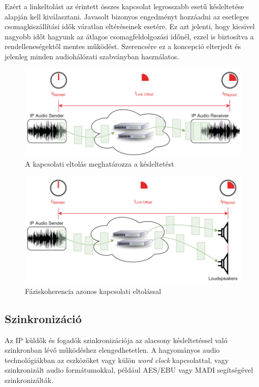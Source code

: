 Ezért a linkeltolást az érintett összes kapcsolat legrosszabb esetű késleltetése alapján kell kiválasztani. 
Javasolt bizonyos engedményt hozzáadni az esetleges csomagkiszállítási idők váratlan eltéréseinek esetére.
Ez azt jelenti, hogy kicsivel nagyobb időt hagyunk az átlagos csomagfeldolgozási időnél, 
ezzel is biztosítva a rendelleneségektől mentes működést.
Szerencsére ez a koncepció elterjedt és jelenleg minden audiohálózati szabványban használatos. 
\begin{figure}[H]
	\centering
	\includegraphics[width=\linewidth, keepaspectratio]{figures/link_offset_latency.png}
	\caption{A kapcsolati eltolás meghatározza a késleltetést \cite{AHNERT2023}}
	\label {fig:link_offset_latency}
\end{figure}
\begin{figure}[H]
	\centering
	\includegraphics[width=\linewidth, keepaspectratio]{figures/phase_coherence_link_offset.png}
	\caption{Fáziskoherencia azonos kapcsolati eltolással \cite{AHNERT2023}}
	\label {fig:phase_coherence_link_offset}
\end{figure}
\subsection{Szinkronizáció}
Az IP küldők és fogadók szinkronizációja az alacsony késleltetéssel való szinkronban lévő működéshez elengedhetetlen.
A hagyományos audio technológiákban az eszközöket vagy külön \textit{word clock} kapcsolattal, 
vagy szinkronizált audio formátumokkal, például AES/EBU vagy MADI segítségével szinkronizálták.


